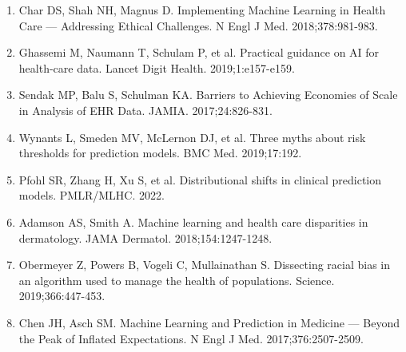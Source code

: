 \documentclass[11pt]{article}
\begin{document}
\begin{enumerate}
\item Char DS, Shah NH, Magnus D. Implementing Machine Learning in Health Care — Addressing Ethical Challenges. N Engl J Med. 2018;378:981-983.
\item Ghassemi M, Naumann T, Schulam P, et al. Practical guidance on AI for health-care data. Lancet Digit Health. 2019;1:e157-e159.
\item Sendak MP, Balu S, Schulman KA. Barriers to Achieving Economies of Scale in Analysis of EHR Data. JAMIA. 2017;24:826-831.
\item Wynants L, Smeden MV, McLernon DJ, et al. Three myths about risk thresholds for prediction models. BMC Med. 2019;17:192.
\item Pfohl SR, Zhang H, Xu S, et al. Distributional shifts in clinical prediction models. PMLR/MLHC. 2022.
\item Adamson AS, Smith A. Machine learning and health care disparities in dermatology. JAMA Dermatol. 2018;154:1247-1248.
\item Obermeyer Z, Powers B, Vogeli C, Mullainathan S. Dissecting racial bias in an algorithm used to manage the health of populations. Science. 2019;366:447-453.
\item Chen JH, Asch SM. Machine Learning and Prediction in Medicine — Beyond the Peak of Inflated Expectations. N Engl J Med. 2017;376:2507-2509.
\end{enumerate}
\end{document}

